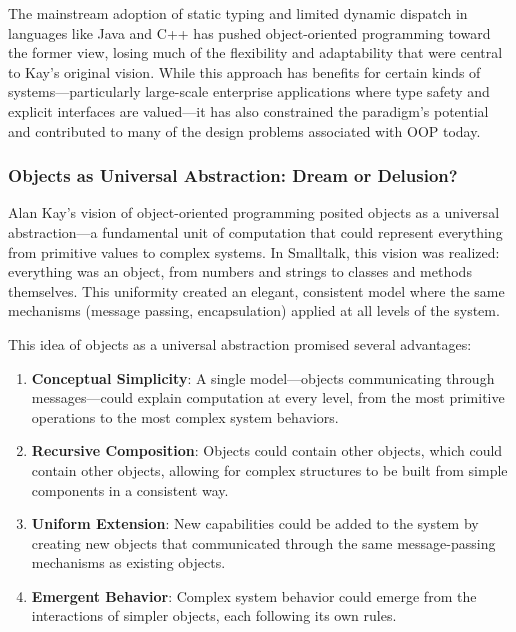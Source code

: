 \documentclass[11pt]{article}
\begin{document}
The mainstream adoption of static typing and limited dynamic dispatch in languages like Java and C++ has pushed object-oriented programming toward the former view, losing much of the flexibility and adaptability that were central to Kay's original vision. While this approach has benefits for certain kinds of systems—particularly large-scale enterprise applications where type safety and explicit interfaces are valued—it has also constrained the paradigm's potential and contributed to many of the design problems associated with OOP today.
\subsubsection{Objects as Universal Abstraction: Dream or Delusion?}
\label{sec:orgfd4493c}

Alan Kay's vision of object-oriented programming posited objects as a universal abstraction—a fundamental unit of computation that could represent everything from primitive values to complex systems. In Smalltalk, this vision was realized: everything was an object, from numbers and strings to classes and methods themselves. This uniformity created an elegant, consistent model where the same mechanisms (message passing, encapsulation) applied at all levels of the system.

This idea of objects as a universal abstraction promised several advantages:

\begin{enumerate}
\item \textbf{Conceptual Simplicity}: A single model—objects communicating through messages—could explain computation at every level, from the most primitive operations to the most complex system behaviors.

\item \textbf{Recursive Composition}: Objects could contain other objects, which could contain other objects, allowing for complex structures to be built from simple components in a consistent way.

\item \textbf{Uniform Extension}: New capabilities could be added to the system by creating new objects that communicated through the same message-passing mechanisms as existing objects.

\item \textbf{Emergent Behavior}: Complex system behavior could emerge from the interactions of simpler objects, each following its own rules.
\end{enumerate}
\end{document}
